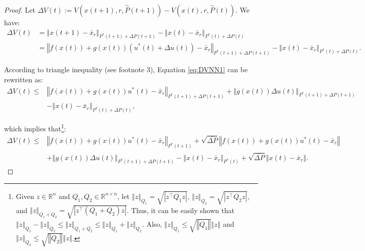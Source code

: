 \documentclass[1p,times]{elsarticle}
\begin{document}
\begin{proof}
Let $\Delta V(t):=V\left(x(t+1),r,\hat{P}(t+1)\right)-V\left(x(t),r,\hat{P}(t)\right)$. We have:{{\color{blue}}
\begin{align}\label{eq:DVNN1}
\Delta V(t)&=\left\Vert x(t+1)-\bar{x}_r\right\Vert_{P^\ast(t+1)+\Delta P(t+1)}-\left\Vert x(t)-\bar{x}_r\right\Vert_{P^\ast(t)+\Delta P(t)}\nonumber\\
&=\left\Vert f\left(x(t)\right)+g\left(x(t)\right)\left(u^\ast(t)+\Delta u(t)\right)-\bar{x}_r\right\Vert_{P^\ast(t+1)+\Delta{P(t+1)}}-\left\Vert x(t)-\bar{x}_r\right\Vert_{P^\ast(t)+\Delta P(t)}.
\end{align}
}

According to triangle inequality (see footnote 3), Equation \eqref{eq:DVNN1} can be rewritten as:{{\color{blue}}
\begin{align}\label{eq:DVNN2}
\Delta V(t)\leq&\left\Vert f\left(x(t)\right)+g\left(x(t)\right)u^\ast(t)-\bar{x}_r\right\Vert_{P^\ast(t+1)+\Delta{P(t+1)}}+\left\Vert g\left(x(t)\right)\Delta{u(t)}\right\Vert_{P^\ast(t+1)+\Delta{P(t+1)}}\nonumber\\
&-\left\Vert x(t)-\bar{x}_r\right\Vert_{P^\ast(t)+\Delta P(t)},
\end{align}
}




which implies that\footnote{Given $z\in\mathbb{R}^n$ and $Q_1,Q_2\in\mathbb{R}^{n\times n}$, let $\left\Vert z\right\Vert_{Q_1}=\sqrt{\left\vert z^\top Q_1z\right\vert}$, $\left\Vert z\right\Vert_{Q_2}=\sqrt{\left\vert z^\top Q_2z\right\vert}$, and $\left\Vert z\right\Vert_{Q_1+Q_2}=\sqrt{\left\vert z^\top (Q_1+Q_2)z\right\vert}$. Thus, it can be easily shown that $\left\Vert z\right\Vert_{Q_1}-\left\Vert z\right\Vert_{Q_2}\leq\left\Vert z\right\Vert_{Q_1+Q_2}\leq\left\Vert z\right\Vert_{Q_1}+\left\Vert z\right\Vert_{Q_2}$. Also, $\left\Vert z\right\Vert_{Q_1}\leq\sqrt{\left\Vert Q_1\right\Vert}\left\Vert z\right\Vert$ and $\left\Vert z\right\Vert_{Q_2}\leq\sqrt{\left\Vert Q_2\right\Vert}\left\Vert z\right\Vert$.}:{{\color{blue}}
\begin{align}\label{eq:DVNN3}
\Delta V(t)\leq&\left\Vert f\left(x(t)\right)+g\left(x(t)\right)u^\ast(t)-\bar{x}_r\right\Vert_{P^\ast(t+1)}+\sqrt{\bar{\Delta{P}}}\left\Vert f\left(x(t)\right)+g\left(x(t)\right)u^\ast(t)-\bar{x}_r\right\Vert\nonumber\\
&+\left\Vert g\left(x(t)\right)\Delta{u(t)}\right\Vert_{P^\ast(t+1)+\Delta{P(t+1)}}-\left\Vert x(t)-\bar{x}_r\right\Vert_{P^\ast(t)}+\sqrt{\bar{\Delta{P}}}\left\Vert x(t)-\bar{x}_r\right\Vert.
\end{align}
}




\end{proof}
\end{document}
